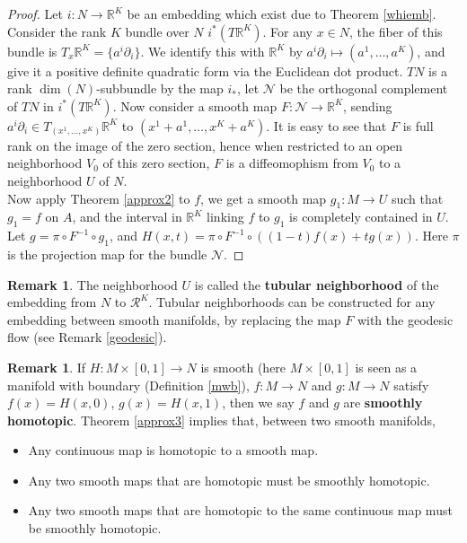 \documentclass{article}
\theoremstyle{definition}
\newtheorem{rmk}[thm]{Remark}
\begin{document}
\begin{proof}
   Let $i: N\rightarrow\mathbb{R}^K$ be an embedding which exist due to Theorem \ref{whiemb}.  Consider the rank $K$ bundle over $N$ $i^*(T\mathbb{R}^K)$. For any $x\in N$, the fiber of this bundle is $T_x\mathbb{R}^K=\{a^i\partial_i\}$. We identify this with $\mathbb{R}^K$ by $a^i\partial_i\mapsto (a^1, \dots, a^K)$, and give it a positive definite quadratic form via the Euclidean dot product. $TN$ is a rank $\dim(N)$-subbundle by the map $i_*$, let $\mathcal{N}$ be the orthogonal complement of $TN$ in $i^*(T\mathbb{R}^K)$. Now consider a smooth map $F: \mathcal{N}\rightarrow \mathbb{R}^K$, sending $a^i\partial_i\in T_(x^1, \dots, x^K)\mathbb{R}^K$ to $(x^1+a^1, \dots, x^K+a^K)$. It is easy to see that $F$ is full rank on the image of the zero section, hence when restricted to an open neighborhood $V_0$ of this zero section, $F$ is a diffeomophism from $V_0$ to a neighborhood $U$ of $N$.\\

   Now apply Theorem \ref{approx2} to $f$, we get a smooth map $g_1: M\rightarrow U$ such that $g_1=f$ on $A$, and the interval in $\mathbb{R}^K$ linking $f$ to $g_1$ is completely contained in $U$. Let $g=\pi\circ F^{-1}\circ g_1$, and $H(x, t)=\pi\circ F^{-1}\circ((1-t)f(x)+tg(x))$. Here $\pi$ is the projection map for the bundle $\mathcal{N}$.
\end{proof}

\begin{rmk}
    The neighborhood $U$ is called the {\bf tubular neighborhood} of the embedding from $N$ to $\mathcal{R}^K$. Tubular neighborhoods can be constructed for any embedding between smooth manifolds, by replacing the map $F$ with the geodesic flow (see Remark \ref{geodesic}).
\end{rmk}

\begin{rmk}\label{smhomotop}
    If $H: M\times [0, 1]\rightarrow N$ is smooth (here $M\times [0, 1]$ is seen as a manifold with boundary (Definition \ref{mwb}), $f: M\rightarrow N$ and $g: M\rightarrow N$ satisfy $f(x)=H(x, 0)$, $g(x)=H(x, 1)$, then we say $f$ and $g$ are {\bf smoothly homotopic}. Theorem \ref{approx3} implies that, between two smooth manifolds,
    \begin{itemize}
        \item Any continuous map is homotopic to a smooth map.
        \item Any two smooth maps that are homotopic must be smoothly homotopic.
        \item Any two smooth maps that are homotopic to the same continuous map must be smoothly homotopic.
    \end{itemize}
\end{rmk}
\end{document}

